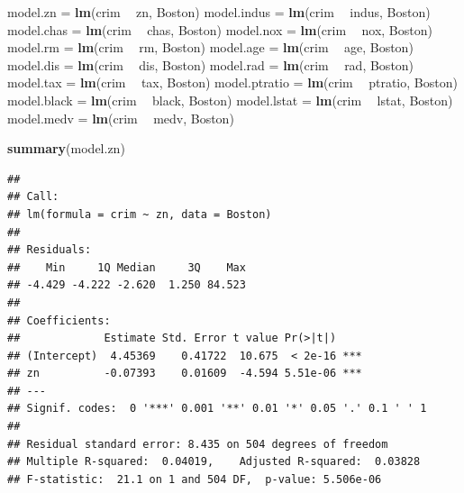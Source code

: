 \documentclass[]{article}
\newenvironment{Shaded}{\begin{snugshade}}{\end{snugshade}}
\newcommand{\KeywordTok}[1]{\textcolor[rgb]{0.13,0.29,0.53}{\textbf{#1}}}
\newcommand{\StringTok}[1]{\textcolor[rgb]{0.31,0.60,0.02}{#1}}
\newcommand{\OperatorTok}[1]{\textcolor[rgb]{0.81,0.36,0.00}{\textbf{#1}}}
\newcommand{\NormalTok}[1]{#1}
\begin{document}
\begin{Shaded}
\begin{Highlighting}[]
\NormalTok{model.zn =}\StringTok{ }\KeywordTok{lm}\NormalTok{(crim }\OperatorTok{~}\StringTok{ }\NormalTok{zn, Boston)}
\NormalTok{model.indus =}\StringTok{ }\KeywordTok{lm}\NormalTok{(crim }\OperatorTok{~}\StringTok{ }\NormalTok{indus, Boston)}
\NormalTok{model.chas =}\StringTok{ }\KeywordTok{lm}\NormalTok{(crim }\OperatorTok{~}\StringTok{ }\NormalTok{chas, Boston)}
\NormalTok{model.nox =}\StringTok{ }\KeywordTok{lm}\NormalTok{(crim }\OperatorTok{~}\StringTok{ }\NormalTok{nox, Boston)}
\NormalTok{model.rm =}\StringTok{ }\KeywordTok{lm}\NormalTok{(crim }\OperatorTok{~}\StringTok{ }\NormalTok{rm, Boston)}
\NormalTok{model.age =}\StringTok{ }\KeywordTok{lm}\NormalTok{(crim }\OperatorTok{~}\StringTok{ }\NormalTok{age, Boston)}
\NormalTok{model.dis =}\StringTok{ }\KeywordTok{lm}\NormalTok{(crim }\OperatorTok{~}\StringTok{ }\NormalTok{dis, Boston)}
\NormalTok{model.rad =}\StringTok{ }\KeywordTok{lm}\NormalTok{(crim }\OperatorTok{~}\StringTok{ }\NormalTok{rad, Boston)}
\NormalTok{model.tax =}\StringTok{ }\KeywordTok{lm}\NormalTok{(crim }\OperatorTok{~}\StringTok{ }\NormalTok{tax, Boston)}
\NormalTok{model.ptratio =}\StringTok{ }\KeywordTok{lm}\NormalTok{(crim }\OperatorTok{~}\StringTok{ }\NormalTok{ptratio, Boston)}
\NormalTok{model.black =}\StringTok{ }\KeywordTok{lm}\NormalTok{(crim }\OperatorTok{~}\StringTok{ }\NormalTok{black, Boston)}
\NormalTok{model.lstat =}\StringTok{ }\KeywordTok{lm}\NormalTok{(crim }\OperatorTok{~}\StringTok{ }\NormalTok{lstat, Boston)}
\NormalTok{model.medv =}\StringTok{ }\KeywordTok{lm}\NormalTok{(crim }\OperatorTok{~}\StringTok{ }\NormalTok{medv, Boston)}

\KeywordTok{summary}\NormalTok{(model.zn)}
\end{Highlighting}
\end{Shaded}

\begin{verbatim}
## 
## Call:
## lm(formula = crim ~ zn, data = Boston)
## 
## Residuals:
##    Min     1Q Median     3Q    Max 
## -4.429 -4.222 -2.620  1.250 84.523 
## 
## Coefficients:
##             Estimate Std. Error t value Pr(>|t|)    
## (Intercept)  4.45369    0.41722  10.675  < 2e-16 ***
## zn          -0.07393    0.01609  -4.594 5.51e-06 ***
## ---
## Signif. codes:  0 '***' 0.001 '**' 0.01 '*' 0.05 '.' 0.1 ' ' 1
## 
## Residual standard error: 8.435 on 504 degrees of freedom
## Multiple R-squared:  0.04019,    Adjusted R-squared:  0.03828 
## F-statistic:  21.1 on 1 and 504 DF,  p-value: 5.506e-06
\end{verbatim}
\end{document}
